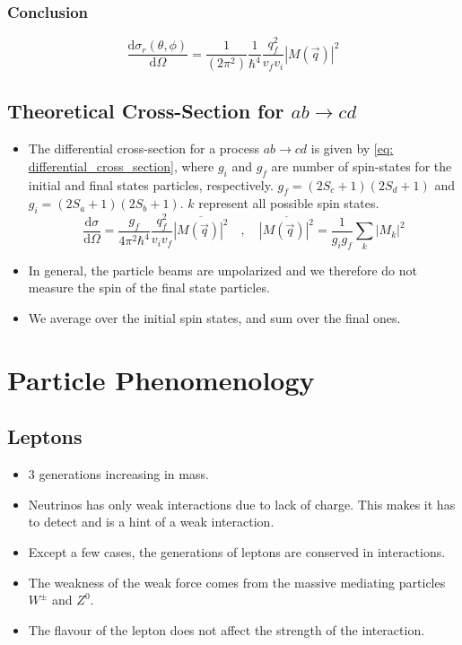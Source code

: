 \subsubsection{Conclusion}
\begin{equation}
\frac{\mathrm{d}σ_r(θ,ϕ)}{\mathrm{d}Ω} = \frac{1}{(2π^2)} \frac{1}{ℏ^{4}} \frac{q_f^2}{v_f v_i} \left|M(\vec{q})\right|^2
\end{equation}

\subsection{Theoretical Cross-Section for $ab → cd$}
\begin{itemize}
    \item The differential cross-section for a process $ab → cd$ is given by \cref{eq: differential_cross_section}, where $g_i$ and $g_f$ are number of spin-states for the initial and final states particles, respectively. $g_f = (2S_{c} + 1)(2S_{d} + 1)$ and $g_i = (2S_{a} + 1)(2S_{b} + 1)$. $k$ represent all possible spin states. 
    \begin{equation}\label{eq: differential_cross_section}
    \frac{\mathrm{d}σ}{\mathrm{d}Ω} = \frac{g_f}{4π^2ℏ^{4}} \frac{q_f^2}{v_i v_f} \overline{|M(\vec{q})|^2} \quad , \quad  \overline{|M(\vec{q})|^2} = \frac{1}{g_i g_f} ∑_{k}^{} \left|M_k\right|^2
    \end{equation}
    \item In general, the particle beams are unpolarized and we therefore do not measure the spin of the final state particles. 
    \item We average over the initial spin states, and sum over the final ones. 
\end{itemize}

\section{Particle Phenomenology}
\subsection{Leptons}
\begin{itemize}
    \item 3 generations increasing in mass. 
    \item Neutrinos has only weak interactions due to lack of charge. This makes it has to detect and is a hint of a weak interaction. 
    \item Except a few cases, the generations of leptons are conserved in interactions.
    \item The weakness of the weak force comes from the massive mediating particles $W^{\pm}$ and $Z^{0}$. 
    \item The flavour of the lepton does not affect the strength of the interaction. 
\end{itemize}